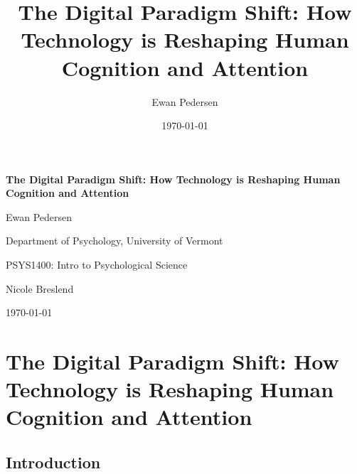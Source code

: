 \documentclass[12pt,letterpaper]{article}
\title{The Digital Paradigm Shift: How Technology is Reshaping Human Cognition and Attention}
\author{Ewan Pedersen}
\date{\today}
\begin{document}
\begin{titlepage}
\centering
\vspace*{2in}

{\Large\bfseries The Digital Paradigm Shift: How Technology is Reshaping Human Cognition and Attention\par}

\vspace{2\baselineskip}

{\large Ewan Pedersen\par}

\vspace{\baselineskip}

{\large Department of Psychology, University of Vermont\par}

\vspace{\baselineskip}

{\large PSYS1400: Intro to Psychological Science\par}

\vspace{\baselineskip}

{\large Nicole Breslend\par}

\vspace{\baselineskip}

{\large \today\par}

\end{titlepage}

\setcounter{page}{2}

\section*{The Digital Paradigm Shift: How Technology is Reshaping Human Cognition and Attention}

\subsection*{Introduction}
\end{document}
